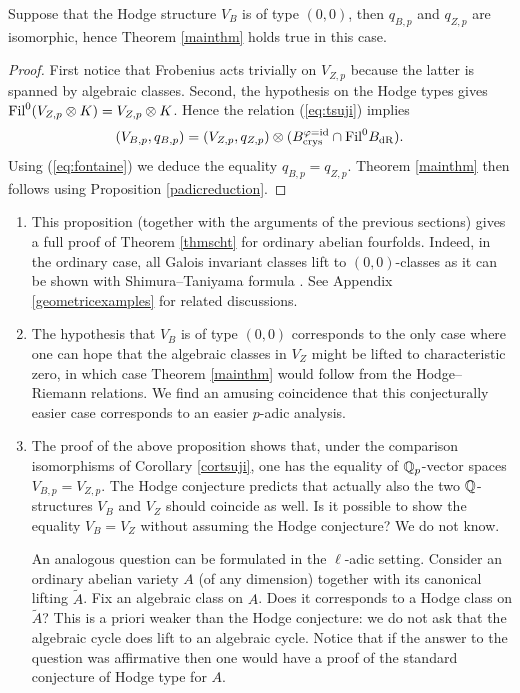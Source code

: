 \begin{prop}
\notready\label{ordinarycase}
Suppose that the Hodge structure $V_B$ is of type $(0,0)$, then $q_{B,p}$ and $q_{Z,p}$ are isomorphic, hence Theorem \ref{mainthm}  holds true in this case.
\end{prop}
\begin{proof}
First notice that   Frobenius acts trivially on $V_{Z,p}$ because the latter is spanned by  algebraic classes. Second, the hypothesis on the Hodge types gives
$\textnormal{Fil}^0(V_{Z,p} \otimes K)=V_{Z,p} \otimes K$. Hence the relation (\ref{eq:tsuji}) implies
\[(V_{B,p},q_{B,p}) =(V_{Z,p},q_{Z,p})\otimes (B_{\textnormal{crys}}^{\varphi=\mathrm{id}} \cap \textnormal{Fil}^0B_{\mathrm{dR}}).\]
Using (\ref{eq:fontaine}) we deduce the equality $q_{B,p} = q_{Z,p}$. Theorem \ref{mainthm}  then follows using  Proposition \ref{padicreduction}.
\end{proof}
\begin{remark}
\notready\label{boris}\begin{enumerate}
\item This proposition (together with the arguments of the previous sections) gives a full proof of Theorem \ref{thmscht} for ordinary abelian fourfolds. Indeed, in the ordinary case, all Galois invariant classes lift to $(0,0)$-classes as it can be shown with Shimura--Taniyama  formula  \cite[Lemma 5]{TateBour}. See Appendix \ref{geometricexamples} for related discussions.
\item\label{duccio} The hypothesis that $V_B$ is of type $(0,0)$ corresponds to the only case where one can hope that the algebraic classes in $V_Z$ might be lifted to characteristic zero, in which case Theorem \ref{mainthm} would follow from the Hodge--Riemann relations. We find an amusing coincidence that this conjecturally easier  case corresponds to an easier $p$-adic analysis.
\item The proof of the above proposition shows that, under the comparison isomorphisms of Corollary \ref{cortsuji}, one has the equality of $\mathbb{Q}_p$-vector spaces $V_{B,p} = V_{Z,p}$. The Hodge conjecture  predicts   that actually also the two $\mathbb{Q}$-structures $V_B$ and $V_Z$ should coincide as well. Is it possible to show the equality $V_{B} = V_{Z}$ without assuming the Hodge conjecture? We do not know.

An analogous question can be formulated in the $\ell$-adic setting. Consider an ordinary abelian variety $A$  (of any dimension) together with its canonical lifting $\tilde{A}$. Fix an algebraic class on $A$. Does it corresponds to a Hodge class on $\tilde{A}$? This is a priori weaker than the Hodge conjecture: we do not ask that the algebraic cycle does lift to an algebraic cycle. Notice that if the answer to the question was affirmative then one would have a proof of the standard conjecture of Hodge type for $A$.
\end{enumerate}
\end{remark}

